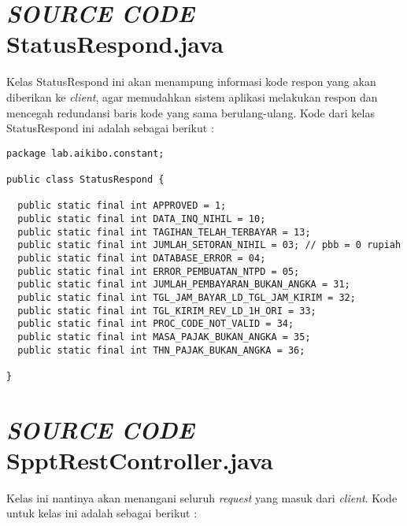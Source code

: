 \documentclass[pdftex,12pt, oneside]{article}
\begin{document}
\section{\textit{SOURCE CODE} StatusRespond.java}

Kelas StatusRespond ini akan menampung informasi kode respon yang akan diberikan ke \textit{client}, agar memudahkan sistem aplikasi melakukan respon dan mencegah redundansi baris kode yang sama berulang-ulang. Kode dari kelas StatusRespond ini adalah sebagai berikut :

\begin{lstlisting}
package lab.aikibo.constant;

public class StatusRespond {

  public static final int APPROVED = 1;
  public static final int DATA_INQ_NIHIL = 10;
  public static final int TAGIHAN_TELAH_TERBAYAR = 13;
  public static final int JUMLAH_SETORAN_NIHIL = 03; // pbb = 0 rupiah
  public static final int DATABASE_ERROR = 04;
  public static final int ERROR_PEMBUATAN_NTPD = 05;
  public static final int JUMLAH_PEMBAYARAN_BUKAN_ANGKA = 31;
  public static final int TGL_JAM_BAYAR_LD_TGL_JAM_KIRIM = 32;
  public static final int TGL_KIRIM_REV_LD_1H_ORI = 33;
  public static final int PROC_CODE_NOT_VALID = 34;
  public static final int MASA_PAJAK_BUKAN_ANGKA = 35;
  public static final int THN_PAJAK_BUKAN_ANGKA = 36;

}
\end{lstlisting}


\section{\textit{SOURCE CODE} SpptRestController.java}

Kelas ini nantinya akan menangani seluruh \textit{request} yang masuk dari \textit{client}. Kode untuk kelas ini adalah sebagai berikut :
\end{document}
